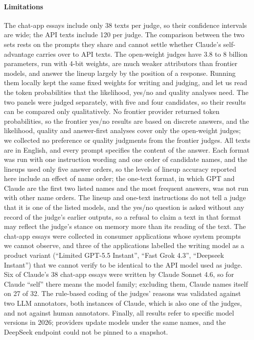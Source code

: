 \paragraph{Limitations}
The chat-app essays include only 38 texts per judge, so their confidence
intervals are wide; the API texts include 120 per judge. The comparison between
the two sets rests on the \CSprompts{} prompts they share and cannot settle
whether Claude's self-advantage carries over to API texts. The open-weight
judges have 3.8 to 8 billion parameters, run with 4-bit weights, are much
weaker attributors than frontier models, and answer the lineup largely by the
position of a response. Running them locally kept the same fixed weights for
writing and judging, and let us read the token probabilities that the
likelihood, yes/no and quality analyses need.
The two panels were judged separately, with five and four candidates, so their
results can be compared only qualitatively. No frontier provider returned token probabilities, so
the frontier yes/no results are based on discrete answers, and the likelihood,
quality and answer-first analyses cover only the open-weight judges; we
collected no preference or quality judgments from the frontier judges. All
texts are in English, and every prompt specifies the content of the answer.
Each format was run with one instruction wording and one order of candidate
names, and the lineups used only five answer orders, so the levels of lineup
accuracy reported here include an effect of name order; the one-text format, in
which GPT and Claude are the first two listed names and the most frequent
answers, was not run with other name orders. The lineup and one-text
instructions do not tell a judge that it is one of the listed models, and the
yes/no question is asked without any record of the judge's earlier outputs, so
a refusal to claim a text in that format may reflect the judge's stance on
memory more than its reading of the text. The chat-app essays were collected in
consumer applications whose system prompts we cannot observe, and three of the
applications labelled the writing model as a product variant (``Limited GPT-5.5
Instant'', ``Fast Grok 4.3'', ``Deepseek Instant'') that we cannot verify to be
identical to the API model used as judge. Six of Claude's 38 chat-app essays
were written by Claude Sonnet 4.6, so for Claude ``self'' there means the model
family; excluding them, Claude names itself on 27 of 32. The rule-based coding of the judges'
reasons was validated against two LLM annotators, both instances of Claude,
which is also one of the judges, and not against human annotators. Finally, all
results refer to specific model versions in 2026; providers update models under
the same names, and the DeepSeek endpoint could not be pinned to a snapshot.

